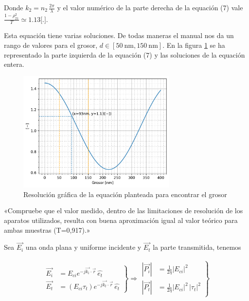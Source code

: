 \documentclass[spanish, a4paper, nobib]{tufte-handout}
\begin{document}
Donde $k_2=n_2 \, \frac{2\pi}{\lambda}$ y el valor numérico de la parte derecha de la equación (7) vale $\frac{1-\rho_{21}^2}{T}\simeq\num{1.13}\text{[.]}$.

Esta equación tiene varias soluciones. De todas maneras el manual nos da un rango de valores para el grosor, $d\in[\qty{50}{\nano\meter}, \qty{150}{\nano\meter}]$. En la figura \ref{fig:grosor} se ha representado la parte izquierda de la equación (7) y las soluciones de la equación entera.

\newpage

\begin{figure}
    \begin{center}
        \includegraphics[width=300px]{grosor.pdf}
    \end{center}
    \caption{Resolución gráfica de la equación planteada para encontrar el grosor}
    \label{fig:grosor}
\end{figure}


«Compruebe que el valor medido, dentro de las limitaciones de resolución de los aparatos utilizados, resulta con buena aproximación igual al valor teórico para ambas muestras (T=0,917).»

\vspace{5px}

Sea $\vec{E_i}$ una onda plana y uniforme incidente y $\vec{E_t}$ la parte transmitida, tenemos

\begin{align}
    \left.
        \begin{aligned}
            \vec{E_i} &= E_{ci} e^{-j\vec{k_i}\cdot\vec{r}} \, \hat{e_t} \quad \\
            \vec{E_t} &= (E_{ci} \tau_t) e^{-j\vec{k_t}\cdot\vec{r}} \, \hat{e_t}
        \end{aligned}
    \right\} \Rightarrow
    \left.
        \begin{aligned}
            |\vec{P_i}| &= \frac{1}{2\eta}|E_{ci}|^2 \quad \\
            |\vec{P_t}| &= \frac{1}{2\eta}|E_{ci}|^2 \, |\tau_t|^2
        \end{aligned}
    \right\}
\end{align}
\end{document}
